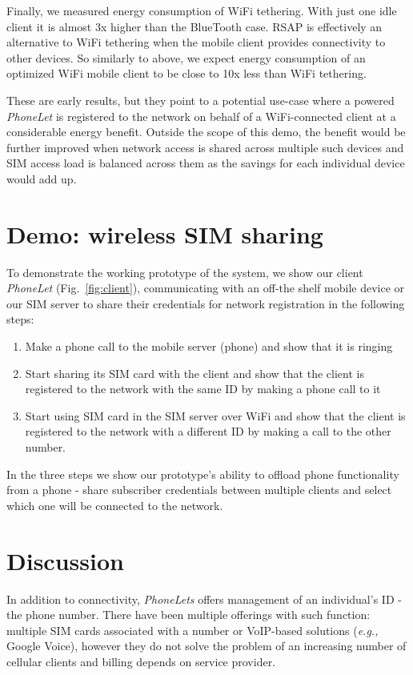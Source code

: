 \documentclass{sig-alternate-10pt}
\providecommand{\eg}{\emph{e.g.,} }
\begin{document}
Finally, we measured energy consumption of WiFi tethering. With just one idle client it is almost 3x higher than the BlueTooth case. RSAP is effectively an alternative to WiFi tethering when the mobile client provides connectivity to other devices. So similarly to above, we expect energy consumption of an optimized WiFi mobile client to be close to 10x less than WiFi tethering.

These are early results, but they point to a potential use-case where a powered \emph{PhoneLet} is registered to the network on behalf of a WiFi-connected client at a considerable energy benefit. Outside the scope of this demo, the benefit would be further improved when network access is shared across multiple such devices and SIM access load is balanced across them as the savings for each individual device would add up.

\section{Demo: wireless SIM sharing}

To demonstrate the working prototype of the system, we show our client \emph{PhoneLet} (Fig.~\ref{fig:client}), communicating with an off-the shelf mobile device or our SIM server to share their credentials for network registration in the following steps:

\begin{enumerate}
    \item Make a phone call to the mobile server (phone) and show that it is ringing
    \item Start sharing its SIM card with the client and show that the client is registered to the network with the same ID by making a phone call to it
    \item Start using SIM card in the SIM server over WiFi and show that the client is registered to the network with a different ID by making a call to the other number.
\end{enumerate}

In the three steps we show our prototype's ability to offload phone functionality from a phone - share subscriber credentials between multiple clients and select which one will be connected to the network.

\section{Discussion}

In addition to connectivity, \emph{PhoneLets} offers management of an individual's ID - the phone number. There have been multiple offerings with such function: multiple SIM cards associated with a number or VoIP-based solutions (\eg Google Voice), however they do not solve the problem of an increasing number of cellular clients and billing depends on service provider.
\end{document}
